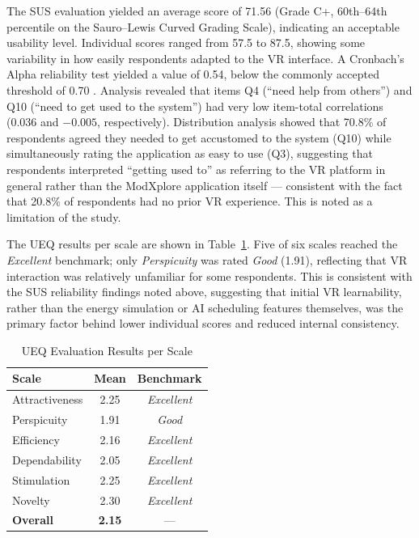 \documentclass[conference]{IEEEtran}
\begin{document}
The SUS evaluation yielded an average score of 71.56 (Grade C+, 60th--64th percentile on the Sauro--Lewis Curved Grading Scale), indicating an acceptable usability level. Individual scores ranged from 57.5 to 87.5, showing some variability in how easily respondents adapted to the VR interface. A Cronbach's Alpha reliability test yielded a value of 0.54, below the commonly accepted threshold of 0.70 \cite{tavakol2011making}. Analysis revealed that items Q4 (``need help from others'') and Q10 (``need to get used to the system'') had very low item-total correlations (0.036 and $-0.005$, respectively). Distribution analysis showed that 70.8\% of respondents agreed they needed to get accustomed to the system (Q10) while simultaneously rating the application as easy to use (Q3), suggesting that respondents interpreted ``getting used to'' as referring to the VR platform in general rather than the ModXplore application itself --- consistent with the fact that 20.8\% of respondents had no prior VR experience. This is noted as a limitation of the study.

The UEQ results per scale are shown in Table~\ref{tab:ueq}. Five of six scales reached the \textit{Excellent} benchmark; only \textit{Perspicuity} was rated \textit{Good} (1.91), reflecting that VR interaction was relatively unfamiliar for some respondents. This is consistent with the SUS reliability findings noted above, suggesting that initial VR learnability, rather than the energy simulation or AI scheduling features themselves, was the primary factor behind lower individual scores and reduced internal consistency.

\begin{table}[htbp]
\caption{UEQ Evaluation Results per Scale}
\label{tab:ueq}
\begin{center}
\begin{tabular}{|l|c|c|}
\hline
\textbf{Scale} & \textbf{Mean} & \textbf{Benchmark} \\
\hline
Attractiveness  & 2.25 & \textit{Excellent} \\
Perspicuity     & 1.91 & \textit{Good} \\
Efficiency      & 2.16 & \textit{Excellent} \\
Dependability   & 2.05 & \textit{Excellent} \\
Stimulation     & 2.25 & \textit{Excellent} \\
Novelty         & 2.30 & \textit{Excellent} \\
\hline
\textbf{Overall} & \textbf{2.15} & --- \\
\hline
\end{tabular}
\end{center}
\end{table}
\end{document}
